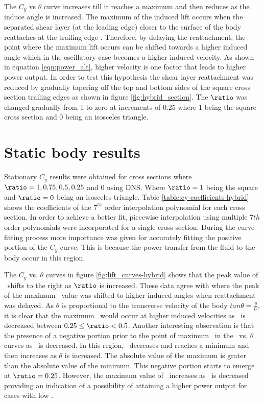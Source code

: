 The $C_y$ vs $\theta$ curve increases till it reaches a maximum and then reduces as the induce angle is increased. The maximum of the induced lift occurs when the separated  shear layer (at the leading edge) closer to the surface of the body reattaches at the trailing edge \citep{Luo1994,Luo2003}. Therefore, by delaying the reattachment, the point where the maximum lift occurs can be shifted towards a higher induced angle which in the oscillatory case becomes a higher induced velocity. As shown in equation \ref{eqn:power_alt}, higher velocity is one factor that leads to higher power output. In order to test this hypothesis the shear layer reattachment was reduced by gradually tapering off the top and bottom sides of the square cross section trailing edges as shown in figure \ref{fig:hybrid_section}. The $\ratio$ was changed gradually from 1 to zero at increments of 0.25 where 1 being the square cross section and 0 being an isosceles triangle.    



\section{Static body results}
 \label{sec:cross-sec-Static body results}


Stationary $C_y$ results were obtained for cross sections where $\ratio=1,0.75,0.5,0.25$ and $0$ using DNS. Where $\ratio=1$ being the square and $\ratio=0$ being an isosceles  triangle. Table \ref{table:cy-coefficients-hybrid} shows the coefficients of the $7^{th}$ order interpolation polynomial for each cross section. In order to achieve a better fit, piecewise interpolation using multiple $7th$ order polynomials were incorporated for a single cross section. During the curve fitting process more importance was given for accurately fitting  the positive portion of the $C_{y}$ curve. This is because the power transfer from the fluid to the body occur in this region. 



The $C_y$ vs. $\theta$ curves in figure \ref{fig:lift_curves-hybrid} shows that the peak value of \cy\ shifts to the right as $\ratio$ is increased. These data agree with \citet{Luo1994} where the peak of the maximum \cy\ value was shifted to higher induced angles when reattachment was delayed. As $\theta$ is proportional to the transverse velocity of the body $tan{\theta}=\frac{\dot{y}}{U}$, it is clear that the maximum \cy\ would occur at higher induced velocities as \ratio\ is decreased between $0.25\leq\ratio<0.5$. Another interesting observation is that the presence of a negative portion prior to the point of maximum \cy\ in the \cy\ vs. $\theta$ curves as \ratio\ is decreased. In this region, \cy\ decreases and reaches a minimum and then increases as $\theta$ is increased. The absolute value of the maximum is grater than the absolute value of the minimum. This negative portion starts to emerge at $\ratio=0.25$. However, the maximum value of \cy\ increases as \ratio\ is decreased providing an indication of a possibility of attaining a higher power output for cases with low \ratio.

